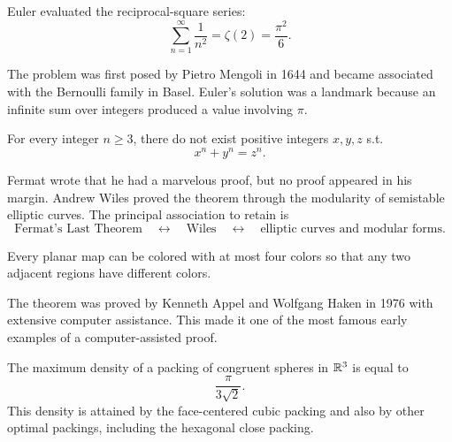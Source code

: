     \begin{theorem}
        Euler evaluated the reciprocal-square series:
        \[
            \sum_{n=1}^{\infty}\frac{1}{n^2}
            =
            \zeta(2)
            =
            \frac{\pi^2}{6}.
        \]
    \end{theorem}

    \begin{remark}
        The problem was first posed by Pietro Mengoli in 1644 and became
        associated with the Bernoulli family in Basel. Euler's solution was a
        landmark because an infinite sum over integers produced a value
        involving $\pi$.
    \end{remark}

    \begin{theorem}
        For every integer $n\ge 3$, there do not exist positive integers
        $x,y,z$ s.t.
        \[
            x^n+y^n=z^n.
        \]
    \end{theorem}

    \begin{remark}
        Fermat wrote that he had a marvelous proof, but no proof appeared in
        his margin. Andrew Wiles proved the theorem through the modularity of
        semistable elliptic curves. The principal association to retain is
        \[
            \text{Fermat's Last Theorem}
            \quad\longleftrightarrow\quad
            \text{Wiles}
            \quad\longleftrightarrow\quad
            \text{elliptic curves and modular forms}.
        \]
    \end{remark}

    \begin{theorem}
        Every planar map can be colored with at most four colors so that any two
        adjacent regions have different colors.
    \end{theorem}

    \begin{remark}
        The theorem was proved by Kenneth Appel and Wolfgang Haken in 1976 with
        extensive computer assistance. This made it one of the most famous early
        examples of a computer-assisted proof.
    \end{remark}

    \begin{theorem}
        The maximum density of a packing of congruent spheres in $\mathbb{R}^3$ is
        equal to
        \[
            \frac{\pi}{3\sqrt{2}}.
        \]
        This density is attained by the face-centered cubic packing and also by
        other optimal packings, including the hexagonal close packing.
    \end{theorem}

